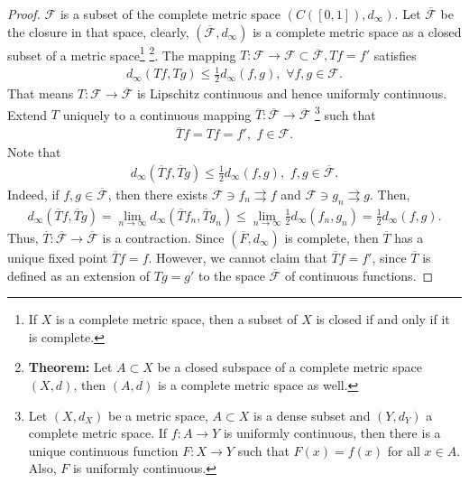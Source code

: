 \documentclass[11pt]{article}
\theoremstyle{definition}
\numberwithin{equation}{subsection}
\begin{document}
\begin{proof}
$\mathcal{F}$ is a subset of the complete metric space $\left(C([0,1]), d_\infty \right)$. Let $\overline{\mathcal{F}}$ be the closure in that space, clearly, $\left(\overline{\mathcal{F}}, d_\infty \right)$ is a complete metric space as a closed subset of a metric space\footnote{If $X$ is a complete metric space, then a subset of $X$ is closed if and only if it is complete.\cite{7}} \footnote{{\bf Theorem:} Let $A \subset X$ be a closed subspace of a complete metric space $(X, d)$, then
$(A, d)$ is a complete metric space as well.\cite{8}}. The mapping $T: \mathcal{F} \to \mathcal{F} \subset \overline{\mathcal{F}}, Tf = f'$ satisfies
\begin{align*}
    d_\infty(Tf, Tg) \leq \frac{1}{2} d_\infty(f, g), \,\, \forall f,g \in \mathcal{F}.
\end{align*}
That means $T: \mathcal{F} \to \overline{\mathcal{F}}$ is Lipschitz continuous and hence uniformly continuous\cite{9}. Extend $T$ uniquely to a continuous mapping $\overline{T}: \overline{\mathcal{F}} \to \overline{\mathcal{F}}$ \footnote{Let $\left(X, d_X\right)$ be a metric space, $A \subset X$ is a dense subset and $\left(Y, d_Y\right)$ a complete metric space. If $f: A \to Y$ is uniformly continuous, then there is a unique continuous function $F: X \to Y$ such that $F(x) = f(x)$ for all $x \in A$. Also, $F$ is uniformly continuous.} such that 
\begin{align*}
    \overline{T}f = Tf = f', \,\, f \in \mathcal{F}.
\end{align*}
Note that 
\begin{align*}
    d_\infty \left(\overline{T}f, \overline{T}g \right) \leq \frac{1}{2} d_\infty (f,g), \,\, f, g \in \overline{\mathcal{F}}.
\end{align*}
Indeed, if $f, g \in \overline{\mathcal{F}}$, then there exists $\mathcal{F} \ni f_n \rightrightarrows f$ and $\mathcal{F} \ni g_n \rightrightarrows g$. Then,
\begin{align*}
    d_\infty \left(\overline{T}f, \overline{T}g \right) = \lim_{n\to\infty} d_\infty \left(\overline{T}f_n, \overline{T}g_n \right) \leq \lim_{n\to\infty} \frac{1}{2} d_\infty \left(f_n, g_n\right) = \frac{1}{2} d_\infty (f,g).
\end{align*}
Thus, $\overline{T}: \overline{\mathcal{F}} \to \overline{\mathcal{F}}$ is a contraction. Since $\left(\overline{F}, d_\infty \right)$ is complete, then $\overline{T}$ has a unique fixed point $\overline{T} f = f$. However, we cannot claim that $\overline{T}f = f'$, since $\overline{T}$ is defined as an extension of $Tg = g'$ to the space $\overline{\mathcal{F}}$ of continuous functions. 


\end{proof}
\end{document}
